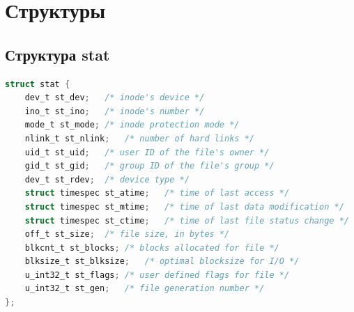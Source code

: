 




\chapter{Структуры}
\section*{Структура stat}
\begin{lstlisting}[language=C]
struct stat {
	dev_t st_dev;	/* inode's device */
	ino_t st_ino;	/* inode's number */
	mode_t st_mode;	/* inode protection mode */
	nlink_t	st_nlink;	/* number of hard links */
	uid_t st_uid;	/* user ID of the file's owner */
	gid_t st_gid;	/* group ID of the file's group */
	dev_t st_rdev;	/* device type */
	struct timespec st_atime;	/* time of last access */
	struct timespec st_mtime;	/* time of last data modification */
	struct timespec st_ctime;	/* time of last file status change */
	off_t st_size;	/* file size, in bytes */
	blkcnt_t st_blocks;	/* blocks allocated for file */
	blksize_t st_blksize;	/* optimal blocksize for I/O */
	u_int32_t st_flags;	/* user defined flags for file */
	u_int32_t st_gen;	/* file generation number */
};
\end{lstlisting}

